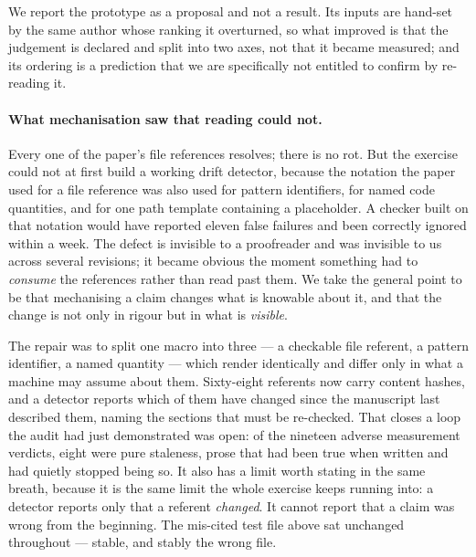 We report the prototype as a proposal and not a result.  Its inputs are
hand-set by the same author whose ranking it overturned, so what improved is
that the judgement is declared and split into two axes, not that it became
measured; and its ordering is a prediction that we are specifically not entitled
to confirm by re-reading it.

\paragraph{What mechanisation saw that reading could not.}  Every one of the
paper's file references resolves; there is no rot.  But the exercise could not
at first build a working drift detector, because the notation the paper used for
a file reference was also used for pattern identifiers, for named code
quantities, and for one path template containing a placeholder.  A checker built
on that notation would have reported eleven false failures and been correctly
ignored within a week.  The defect is invisible to a proofreader and was
invisible to us across several revisions; it became obvious the moment something
had to \emph{consume} the references rather than read past them.  We take the
general point to be that mechanising a claim changes what is knowable about it,
and that the change is not only in rigour but in what is \emph{visible}.

The repair was to split one macro into three --- a checkable file referent, a
pattern identifier, a named quantity --- which render identically and differ
only in what a machine may assume about them.  Sixty-eight referents now carry
content hashes, and a detector reports which of them have changed since the
manuscript last described them, naming the sections that must be re-checked.
That closes a loop the audit had just demonstrated was open: of the nineteen
adverse measurement verdicts, eight were pure staleness, prose that had been
true when written and had quietly stopped being so.  It also has a limit worth
stating in the same breath, because it is the same limit the whole exercise
keeps running into: a detector reports only that a referent \emph{changed}.  It
cannot report that a claim was wrong from the beginning.  The mis-cited test
file above sat unchanged throughout --- stable, and stably the wrong file.

